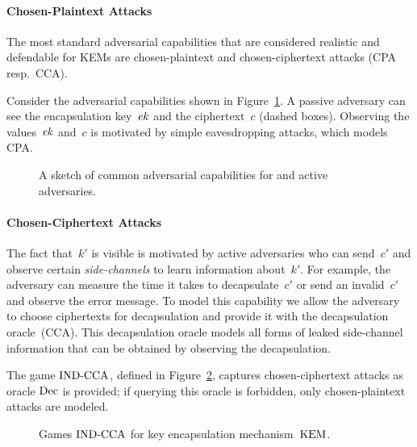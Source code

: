 \paragraph{Chosen-Plaintext Attacks}
The most standard adversarial capabilities that are considered realistic and defendable for KEMs are chosen-plaintext and chosen-ciphertext attacks (CPA resp.\ CCA).

Consider the adversarial capabilities shown in Figure~\ref{fig:adv_capabilities}.
A passive adversary can see the encapsulation key~$\mathit{ek}$ and the ciphertext~$c$ (dashed boxes).
Observing the values~$\mathit{ek}$ and~$c$ is motivated by simple eavesdropping attacks, which models CPA.

\begin{figure}[!ht]
    \centering
    \caption[A sketch of common adversarial capabilities]{%
        A sketch of common adversarial capabilities for  and \textcolor{redb}{active} adversaries.
    }
    \label{fig:adv_capabilities}
\end{figure}

\paragraph{Chosen-Ciphertext Attacks}
The fact that~$k'$ is visible is motivated by active adversaries who can send~$c'$ and observe certain \emph{side-channels} to learn information about~$k'$.
For example, the adversary can measure the time it takes to decapsulate~$c'$ or send an invalid~$c'$ and observe the error message.
To model this capability we allow the adversary to choose ciphertexts for decapsulation and provide it with the decapsulation oracle~(CCA).
This decapsulation oracle models all forms of leaked side-channel information that can be obtained by observing the decapsulation.

The game ${\mathrm{IND}\text{-}\mathrm{CCA}}$, defined in Figure~\ref{fig:kem:ind}, captures chosen-ciphertext attacks as oracle $\mathrm{Dec}$ is provided;
if querying this oracle is forbidden, only chosen-plaintext attacks are modeled.

\begin{figure}[!ht]
    \centering
    \nicoresetlinenr%
    \fbox{%
        \scalebox{\codescalefactor}{%
        }%
    }
    \caption{%
        Games ${\mathrm{IND}\text{-}\mathrm{CCA}}$ for key encapsulation mechanism~$\mathrm{KEM}$.
    }
    \label{fig:kem:ind}
\end{figure}

